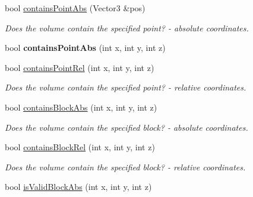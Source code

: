 \begin{DoxyCompactItemize}
\item 
\hypertarget{classVoxelVolume_a3c9a3442d8cfe50e3f9882e4949578a6}{
bool \hyperlink{classVoxelVolume_a3c9a3442d8cfe50e3f9882e4949578a6}{contains\-Point\-Abs} (\-Vector3 \&pos)}
\label{d0/d1c/classVoxelVolume_a3c9a3442d8cfe50e3f9882e4949578a6}

\begin{DoxyCompactList}\small\item\em \-Does the volume contain the specified point? -\/ absolute coordinates. \end{DoxyCompactList}\item 
\hypertarget{classVoxelVolume_ad511bed9d9100765ce00fa4ee469f781}{
bool {\bfseries contains\-Point\-Abs} (int x, int y, int z)}
\label{d0/d1c/classVoxelVolume_ad511bed9d9100765ce00fa4ee469f781}

\item 
\hypertarget{classVoxelVolume_a3b6ed327f5f9b718d68e341e053271c5}{
bool \hyperlink{classVoxelVolume_a3b6ed327f5f9b718d68e341e053271c5}{contains\-Point\-Rel} (int x, int y, int z)}
\label{d0/d1c/classVoxelVolume_a3b6ed327f5f9b718d68e341e053271c5}

\begin{DoxyCompactList}\small\item\em \-Does the volume contain the specified point? -\/ relative coordinates. \end{DoxyCompactList}\item 
\hypertarget{classVoxelVolume_adce4bd2b9ef0868e0c9b1ffdb2d7b189}{
bool \hyperlink{classVoxelVolume_adce4bd2b9ef0868e0c9b1ffdb2d7b189}{contains\-Block\-Abs} (int x, int y, int z)}
\label{d0/d1c/classVoxelVolume_adce4bd2b9ef0868e0c9b1ffdb2d7b189}

\begin{DoxyCompactList}\small\item\em \-Does the volume contain the specified block? -\/ absolute coordinates. \end{DoxyCompactList}\item 
\hypertarget{classVoxelVolume_aef5b3b4fdb28816f534b181c287a77f8}{
bool \hyperlink{classVoxelVolume_aef5b3b4fdb28816f534b181c287a77f8}{contains\-Block\-Rel} (int x, int y, int z)}
\label{d0/d1c/classVoxelVolume_aef5b3b4fdb28816f534b181c287a77f8}

\begin{DoxyCompactList}\small\item\em \-Does the volume contain the specified block? -\/ relative coordinates. \end{DoxyCompactList}\item 
\hypertarget{classVoxelVolume_a19708d3d9ae802e26f12ec73b9fce76f}{
bool \hyperlink{classVoxelVolume_a19708d3d9ae802e26f12ec73b9fce76f}{is\-Valid\-Block\-Abs} (int x, int y, int z)}
\label{d0/d1c/classVoxelVolume_a19708d3d9ae802e26f12ec73b9fce76f}


\end{DoxyCompactItemize}
